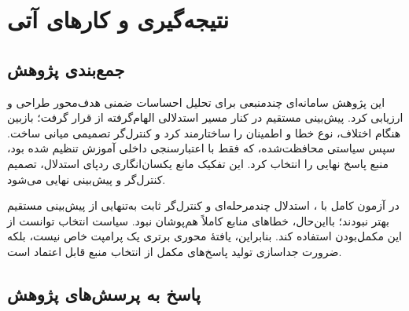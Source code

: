 \chapter{نتیجه‌گیری و کارهای آتی}

\section{جمع‌بندی پژوهش}

این پژوهش سامانه‌ای چندمنبعی برای تحلیل احساسات ضمنی هدف‌محور طراحی و ارزیابی کرد. پیش‌بینی مستقیم در کنار مسیر استدلالی الهام‌گرفته از  قرار گرفت؛ بازبین هنگام اختلاف، نوع خطا و اطمینان را ساختارمند کرد و کنترل‌گر تصمیمی میانی ساخت. سپس سیاستی محافظت‌شده، که فقط با اعتبارسنجی داخلی آموزش تنظیم شده بود، منبع پاسخ نهایی را انتخاب کرد. این تفکیک مانع یکسان‌انگاری ردپای استدلال، تصمیم کنترل‌گر و پیش‌بینی نهایی می‌شود.

در آزمون کامل  با ، استدلال چندمرحله‌ای و کنترل‌گر ثابت به‌تنهایی از پیش‌بینی مستقیم بهتر نبودند؛ بااین‌حال، خطاهای منابع کاملاً هم‌پوشان نبود. سیاست انتخاب توانست از این مکمل‌بودن استفاده کند. بنابراین، یافتۀ محوری برتری یک پرامپت خاص نیست، بلکه ضرورت جداسازی تولید پاسخ‌های مکمل از انتخاب منبع قابل اعتماد است.

\section{پاسخ به پرسش‌های پژوهش}

